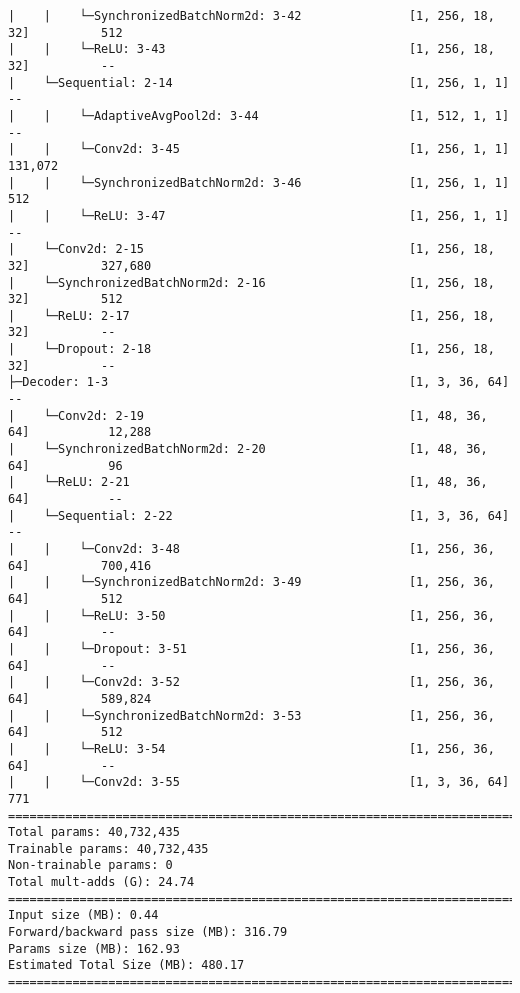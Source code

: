 \begin{verbatim}
|    |    └─SynchronizedBatchNorm2d: 3-42               [1, 256, 18, 32]          512
|    |    └─ReLU: 3-43                                  [1, 256, 18, 32]          --
|    └─Sequential: 2-14                                 [1, 256, 1, 1]            --
|    |    └─AdaptiveAvgPool2d: 3-44                     [1, 512, 1, 1]            --
|    |    └─Conv2d: 3-45                                [1, 256, 1, 1]            131,072
|    |    └─SynchronizedBatchNorm2d: 3-46               [1, 256, 1, 1]            512
|    |    └─ReLU: 3-47                                  [1, 256, 1, 1]            --
|    └─Conv2d: 2-15                                     [1, 256, 18, 32]          327,680
|    └─SynchronizedBatchNorm2d: 2-16                    [1, 256, 18, 32]          512
|    └─ReLU: 2-17                                       [1, 256, 18, 32]          --
|    └─Dropout: 2-18                                    [1, 256, 18, 32]          --
├─Decoder: 1-3                                          [1, 3, 36, 64]            --
|    └─Conv2d: 2-19                                     [1, 48, 36, 64]           12,288
|    └─SynchronizedBatchNorm2d: 2-20                    [1, 48, 36, 64]           96
|    └─ReLU: 2-21                                       [1, 48, 36, 64]           --
|    └─Sequential: 2-22                                 [1, 3, 36, 64]            --
|    |    └─Conv2d: 3-48                                [1, 256, 36, 64]          700,416
|    |    └─SynchronizedBatchNorm2d: 3-49               [1, 256, 36, 64]          512
|    |    └─ReLU: 3-50                                  [1, 256, 36, 64]          --
|    |    └─Dropout: 3-51                               [1, 256, 36, 64]          --
|    |    └─Conv2d: 3-52                                [1, 256, 36, 64]          589,824
|    |    └─SynchronizedBatchNorm2d: 3-53               [1, 256, 36, 64]          512
|    |    └─ReLU: 3-54                                  [1, 256, 36, 64]          --
|    |    └─Conv2d: 3-55                                [1, 3, 36, 64]            771
=========================================================================================================
Total params: 40,732,435
Trainable params: 40,732,435
Non-trainable params: 0
Total mult-adds (G): 24.74
=========================================================================================================
Input size (MB): 0.44
Forward/backward pass size (MB): 316.79
Params size (MB): 162.93
Estimated Total Size (MB): 480.17
=========================================================================================================

\end{verbatim}










